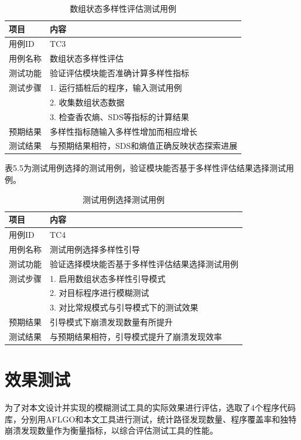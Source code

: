 \documentclass[bachelor]{njupthesis}
\begin{document}
\begin{table}[hbt]
\centering
\caption{数组状态多样性评估测试用例}
\label{tab:tc3}
\begin{tabular}{ll}
\toprule
\textbf{项目} & \textbf{内容} \\
\midrule
用例ID & TC3 \\
用例名称 & 数组状态多样性评估 \\
测试功能 & 验证评估模块能否准确计算多样性指标 \\
测试步骤 & 1. 运行插桩后的程序，输入测试用例 \\
& 2. 收集数组状态数据 \\
& 3. 检查香农熵、SDS等指标的计算结果 \\
预期结果 & 多样性指标随输入多样性增加而相应增长 \\
测试结果 & 与预期结果相符，SDS和熵值正确反映状态探索进展 \\
\bottomrule
\end{tabular}
\end{table}

表5.5为测试用例选择的测试用例，验证模块能否基于多样性评估结果选择测试用例。

\begin{table}[hbt]
\centering
\caption{测试用例选择测试用例}
\label{tab:tc4}
\begin{tabular}{ll}
\toprule
\textbf{项目} & \textbf{内容} \\
\midrule
用例ID & TC4 \\
用例名称 & 测试用例选择多样性引导 \\
测试功能 & 验证选择模块能否基于多样性评估结果选择测试用例 \\
测试步骤 & 1. 启用数组状态多样性引导模式 \\
& 2. 对目标程序进行模糊测试 \\
& 3. 对比常规模式与引导模式下的测试效果 \\
预期结果 & 引导模式下崩溃发现数量有所提升 \\
测试结果 & 与预期结果相符，引导模式提升了崩溃发现效率 \\
\bottomrule
\end{tabular}
\end{table}

\section{效果测试}

为了对本文设计并实现的模糊测试工具的实际效果进行评估，选取了4个程序代码库，分别用AFLGO和本文工具进行测试，统计路径发现数量、程序覆盖率和独特崩溃发现数量作为衡量指标，以综合评估测试工具的性能。
\end{document}
